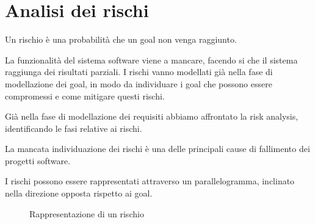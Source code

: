 \chapter{Analisi dei rischi}
\begin{tcolorbox}[colback=red!5!white,colframe=red!75!black, title=Rischio]
    Un rischio è una probabilità che un goal non venga raggiunto.
\end{tcolorbox}
La funzionalità del sistema software viene a mancare, facendo si che il sistema
raggiunga dei risultati parziali. I rischi vanno modellati già nella fase di modellazione 
dei goal, in modo da individuare i goal che possono essere compromessi e come mitigare
questi rischi.

Già nella fase di modellazione dei requisiti abbiamo affrontato la risk analysis,
identificando le fasi relative ai rischi.
\begin{figure}[H]
    \centering
\end{figure}
La mancata individuazione dei rischi è una delle principali cause di fallimento
dei progetti software. 

I rischi possono essere rappresentati attraverso un parallelogramma, inclinato
nella direzione opposta rispetto ai goal.
\begin{figure}[H]
    \centering
    \caption{Rappresentazione di un rischio}
\end{figure}

